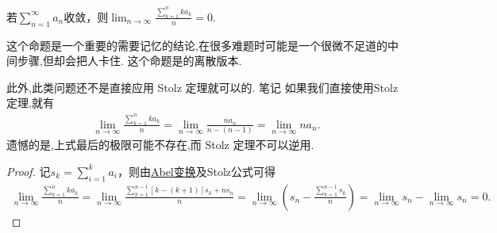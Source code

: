 \documentclass[../../main.tex]{subfiles}%
\begin{document}
\begin{proposition}\label{proposition:级数收敛平均级数必收敛}
若$\sum_{n=1}^{\infty}a_n$收敛，则$\lim_{n\rightarrow \infty}\frac{\sum\limits_{k=1}^n{ka_k}}{n}=0$.
\end{proposition}
\begin{remark}
这个命题是一个重要的需要记忆的结论,在很多难题时可能是一个很微不足道的中间步骤,但却会把人卡住.
这个命题是的离散版本.
\end{remark}
\begin{note}
此外,此类问题还不是直接应用 Stolz 定理就可以的.
笔记 如果我们直接使用Stolz 定理,就有
\begin{align*}
\lim_{n \to \infty} \frac{\sum\limits_{k=1}^n k a_k}{n} = \lim_{n \to \infty} \frac{n a_n}{n - (n - 1)} = \lim_{n \to \infty} n a_n.
\end{align*}
遗憾的是,上式最后的极限可能不存在,而 Stolz 定理不可以逆用.
\end{note}
\begin{proof}
记$s_k=\sum_{i=1}^k{a_i}$，则由\hyperref[theorem:Abel变换]{Abel变换}及Stolz公式可得
\begin{align*}
\lim_{n\rightarrow \infty}\frac{\sum\limits_{k=1}^n{ka_k}}{n}=\lim_{n\rightarrow \infty}\frac{\sum\limits_{k=1}^{n-1}\left[ k-\left( k+1 \right) \right] s_k+ns_n}{n}
=\lim_{n\rightarrow \infty}\left( s_n-\frac{\sum\limits_{k=1}^{n-1}s_k}{n} \right)
=\lim_{n\rightarrow \infty}s_n-\lim_{n\rightarrow \infty}s_n=0.
\end{align*}
\end{proof}
\end{document}
